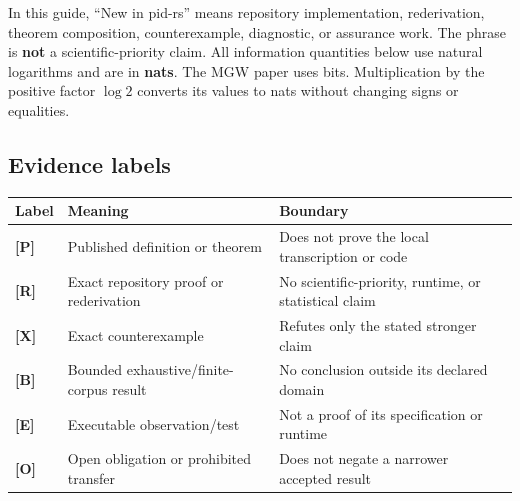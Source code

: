 \documentclass[
  11pt,
  a4paper,
]{article}
\newcounter{none} %
\begin{document}
In this guide, ``New in pid-rs'' means repository implementation,
rederivation, theorem composition, counterexample, diagnostic, or
assurance work. The phrase is \textbf{not} a scientific-priority claim.
All information quantities below use natural logarithms and are in
\textbf{nats}. The MGW paper uses bits. Multiplication by the positive
factor \(\log 2\) converts its values to nats without changing signs or
equalities.


\subsection{Evidence labels}\label{evidence-labels}

{\def\LTcaptype{none} %
\begin{longtable}[]{@{}
  >{\raggedright\arraybackslash}p{}
  >{\raggedright\arraybackslash}p{}
  >{\raggedright\arraybackslash}p{}@{}}
\toprule\noalign{}
\begin{minipage}[b]{\linewidth}\raggedright
Label
\end{minipage} & \begin{minipage}[b]{\linewidth}\raggedright
Meaning
\end{minipage} & \begin{minipage}[b]{\linewidth}\raggedright
Boundary
\end{minipage} \\
\midrule\noalign{}
\endhead
\bottomrule\noalign{}
\endlastfoot
\textbf{{[}P{]}} & Published definition or theorem & Does not prove the
local transcription or code \\
\textbf{{[}R{]}} & Exact repository proof or rederivation & No
scientific-priority, runtime, or statistical claim \\
\textbf{{[}X{]}} & Exact counterexample & Refutes only the stated
stronger claim \\
\textbf{{[}B{]}} & Bounded exhaustive/finite-corpus result & No
conclusion outside its declared domain \\
\textbf{{[}E{]}} & Executable observation/test & Not a proof of its
specification or runtime \\
\textbf{{[}O{]}} & Open obligation or prohibited transfer & Does not
negate a narrower accepted result \\
\end{longtable}
}
\end{document}
